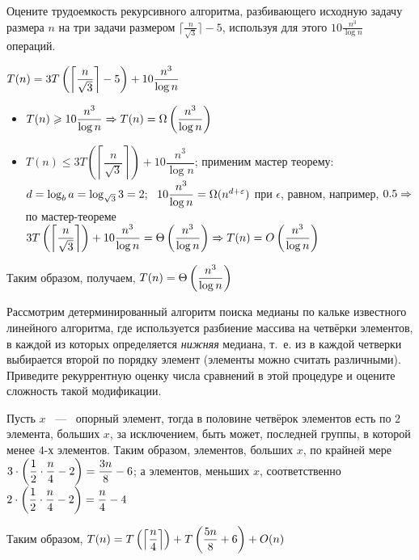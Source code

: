 \documentclass[a4paper,12pt]{article}
\begin{document}
\begin{tasknum}{5}
		Оцените трудоемкость рекурсивного алгоритма, разбивающего исходную задачу размера $n$ на три задачи размером $\lceil\frac{n}{\sqrt{3}}\rceil-5$, используя для этого $10\frac{n^3}{\log n}$ операций.
\end{tasknum}
	
	\begin{solution}
		
		$T(n) \hm{=} 3T\left(\left \lceil\dfrac{n}{\sqrt{3}}\right \rceil-5 \right) + 10\dfrac{n^3}{\log n}$
		\begin{itemize}
		\item $T(n) \ge 10\dfrac{n^3}{\log n} \Ra T(n) \hm{=} \Omega\left(\dfrac{n^3}{\log n}\right)$
		
		\item $T(n) \le 3T\left(\left \lceil\dfrac{n}{\sqrt{3}}\right \rceil\right) + 10\dfrac{n^3}{\log n}$; применим мастер теорему: $d \hm{=} \log_b a \hm{=} \log_{\sqrt{3}}3 \hm{=} 2; \ \ 10\dfrac{n^3}{\log n} \hm{=} \Omega(n^{d+\epsilon})$ при $\epsilon$, равном, например, $0.5 \Rightarrow$ по мастер-теореме $3T\left(\left \lceil\dfrac{n}{\sqrt{3}}\right \rceil\right) + 10\dfrac{n^3}{\log n} \hm{=} \Theta\left(\dfrac{n^3}{\log n}\right) \Ra T(n) \hm{=} O\left(\dfrac{n^3}{\log n}\right)$
		
	\end{itemize}

	Таким образом, получаем, $T(n) \hm{=} \Theta\left(\dfrac{n^3}{\log n}\right)$
	
	\end{solution}

\begin{tasknum}{6}
	
	Рассмотрим детерминированный алгоритм поиска медианы по кальке известного линейного алгоритма, где используется разбиение массива на четвёрки элементов, в каждой из которых определяется \emph{нижняя} медиана, т.~е. из в каждой четверки выбирается второй по порядку элемент (элементы можно считать различными). Приведите рекуррентную оценку числа сравнений в этой процедуре и оцените сложность такой модификации.     
	
\end{tasknum}

\begin{solution}
	
	Пусть $x$ ~---~ опорный элемент, тогда в половине четвёрок элементов есть по $2$ элемента, больших $x$, за исключением, быть может, последней группы, в которой менее $4$-х элементов. Таким образом, элементов, больших $x$, по крайней мере $3 \cdot \left( \dfrac{1}{2} \cdot \dfrac{n}{4} - 2 \right) \hm{=} \dfrac{3n}{8} - 6$; а элементов, меньших $x$, соответственно $2 \cdot \left( \dfrac{1}{2} \cdot \dfrac{n}{4} - 2 \right) \hm{=} \dfrac{n}{4} - 4$
	
	Таким образом, $T(n) \hm{=} T\left(\left\lceil \dfrac{n}{4}\right\rceil \right) + T\left(\dfrac{5n}{8} + 6 \right) + O(n)$ 
	
\end{solution}
\end{document}
